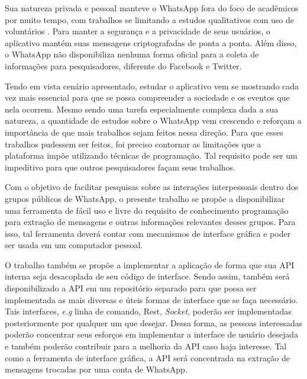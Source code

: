 Sua natureza privada e pessoal manteve o WhatsApp fora do foco de acadêmicos por muito tempo, com trabalhos se limitando a estudos qualitativos com uso de voluntários \cite{garimella2018whatapp}. Para manter a segurança e a privacidade de seus usuários, o aplicativo mantém suas mensagens criptografadas de ponta a ponta. Além disso, o WhatsApp não disponibiliza nenhuma forma oficial para a coleta de informações para pesquisadores, diferente do Facebook e Twitter. 

Tendo em vista cenário apresentado, estudar o aplicativo vem se mostrando cada vez mais essencial para que se possa compreender a sociedade e os eventos que nela ocorrem. Mesmo sendo uma tarefa especialmente complexa dada a sua natureza, a quantidade de estudos sobre o WhatsApp vem crescendo e reforçam a importância de que mais trabalhos sejam feitos nessa direção. Para que esses trabalhos pudessem ser feitos, foi preciso contornar as limitações que a plataforma impõe utilizando técnicas de programação. Tal requisito pode ser um impeditivo para que outros pesquisadores façam seus trabalhos.

Com o objetivo de facilitar pesquisas sobre as interações interpessoais dentro dos grupos públicos de WhatsApp, o presente trabalho se propõe a disponibilizar uma ferramenta de fácil uso e livre do requisito de conhecimento programação para extração de mensagens e outras informações relevantes desses grupos. Para isso, tal ferramenta deverá contar com mecanismos de interface gráfica e poder ser usada em um computador pessoal.

O trabalho também se propõe a implementar a aplicação de forma que sua API interna seja desacoplada de seu código de interface. Sendo assim, também será disponibilizado a API em um repositório separado para que possa ser implementada as mais diversas e úteis formas de interface que se faça necessário. Tais interfaces, \textit{e.g} linha de comando, Rest, \textit{Socket}, poderão ser implementadas posteriormente por qualquer um que desejar. Dessa forma, as pessoas interessadas poderão concentrar seus esforços em implementar a interface de usuário desejada e também poderão contribuir para a melhoria da API caso haja interesse. Tal como a ferramenta de interface gráfica, a API será concentrada na extração de mensagens trocadas por uma conta de WhatsApp. 

